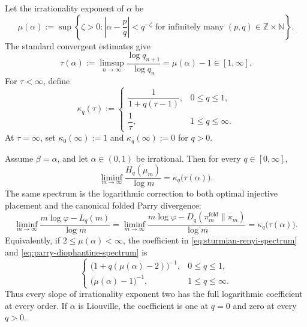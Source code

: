 Let the irrationality exponent of \(\alpha\) be
\[
\mu(\alpha)
:=
\sup\left\{\zeta>0:
\left|\alpha-\frac pq\right|<q^{-\zeta}
\text{ for infinitely many }(p,q)\in\mathbb Z\times\mathbb N
\right\}.
\]
The standard convergent estimates give
\begin{equation}\label{eq:irrationality-exponent-denominators}
\tau(\alpha)
:=
\limsup_{n\to\infty}\frac{\log q_{n+1}}{\log q_n}
=\mu(\alpha)-1\in[1,\infty].
\end{equation}
For \(\tau<\infty\), define
\[
\kappa_q(\tau)
:=
\begin{cases}
\dfrac{1}{1+q(\tau-1)},&0\le q\le1,\\[0.9em]
\dfrac{1}{\tau},&1\le q\le\infty.
\end{cases}
\]
At \(\tau=\infty\), set
\(\kappa_0(\infty):=1\) and
\(\kappa_q(\infty):=0\) for \(q>0\).

\begin{theorem}
\label{thm:diophantine-renyi-spectrum}
Assume \(\beta=\alpha\), and let \(\alpha\in(0,1)\) be irrational. Then for
every \(q\in[0,\infty]\),
\begin{equation}\label{eq:sturmian-renyi-spectrum}
\liminf_{m\to\infty}
\frac{H_q(\mu_m)}{\log m}
=
\kappa_q\bigl(\tau(\alpha)\bigr).
\end{equation}
The same spectrum is the logarithmic correction to both optimal injective
placement and the canonical folded Parry divergence:
\begin{equation}\label{eq:parry-diophantine-spectrum}
\liminf_{m\to\infty}
\frac{m\log\varphi-L_q(m)}{\log m}
=
\liminf_{m\to\infty}
\frac{m\log\varphi-D_q(\pi_m^{\mathrm{fold}}\|\pi_m)}{\log m}
=
\kappa_q\bigl(\tau(\alpha)\bigr).
\end{equation}
Equivalently, if \(2\le\mu(\alpha)<\infty\), the coefficient in
\eqref{eq:sturmian-renyi-spectrum} and
\eqref{eq:parry-diophantine-spectrum} is
\[
\begin{cases}
\bigl(1+q(\mu(\alpha)-2)\bigr)^{-1},&0\le q\le1,\\
\bigl(\mu(\alpha)-1\bigr)^{-1},&1\le q\le\infty.
\end{cases}
\]
Thus every slope of irrationality exponent two has the full logarithmic
coefficient at every order. If \(\alpha\) is Liouville, the coefficient is
one at \(q=0\) and zero at every \(q>0\).
\end{theorem}

